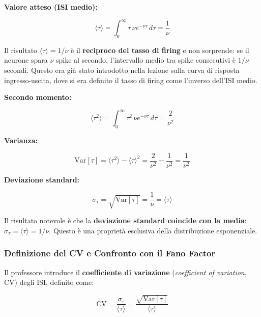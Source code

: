 \textbf{Valore atteso (ISI medio):}

\begin{equation}
\langle \tau \rangle = \int_0^\infty \tau \, \nu e^{-\nu \tau} \, d\tau = \frac{1}{\nu}
\end{equation}

Il risultato $\langle \tau \rangle = 1/\nu$ è il \textbf{reciproco del tasso di firing} e non sorprende: se il neurone spara $\nu$ spike al secondo, l'intervallo medio tra spike consecutivi è $1/\nu$ secondi. Questo era già stato introdotto nella lezione sulla curva di risposta ingresso-uscita, dove si era definito il tasso di firing come l'inverso dell'ISI medio.

\textbf{Secondo momento:}

\begin{equation}
\langle \tau^2 \rangle = \int_0^\infty \tau^2 \, \nu e^{-\nu \tau} \, d\tau = \frac{2}{\nu^2}
\end{equation}

\textbf{Varianza:}

\begin{equation}
\text{Var}[\tau] = \langle \tau^2 \rangle - \langle \tau \rangle^2 = \frac{2}{\nu^2} - \frac{1}{\nu^2} = \frac{1}{\nu^2}
\end{equation}

\textbf{Deviazione standard:}

\begin{equation}
\sigma_\tau = \sqrt{\text{Var}[\tau]} = \frac{1}{\nu} = \langle \tau \rangle
\end{equation}

Il risultato notevole è che la \textbf{deviazione standard coincide con la media}: $\sigma_\tau = \langle \tau \rangle = 1/\nu$. Questo è una proprietà esclusiva della distribuzione esponenziale.



\subsubsection{Definizione del CV e Confronto con il Fano Factor}

Il professore introduce il \textbf{coefficiente di variazione} (\textit{coefficient of variation}, CV) degli ISI, definito come:

\begin{equation}
\text{CV} = \frac{\sigma_\tau}{\langle \tau \rangle} = \frac{\sqrt{\text{Var}[\tau]}}{\langle \tau \rangle}
\end{equation}

